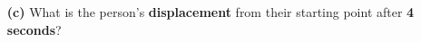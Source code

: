 \documentclass[A4,12pt]{article}
\begin{document}
\begin{enumerate}[label=\bfseries (\arabic*)]
\begin{itemize}
    \item[\bf (c)] What is the person’s \textbf{displacement} from their starting point after \textbf{4 seconds}?

\end{itemize}
\end{enumerate}
\end{document}
